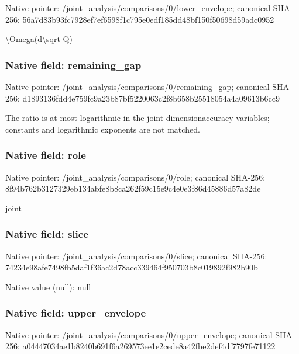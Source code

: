 \documentclass[10pt,a4paper]{article}
\begin{document}
Native pointer: /joint\_analysis/comparis\allowbreak{}ons/0/lower\_envelope; canonical SHA-256: 56a7d83b93fc7928ef7ef659\allowbreak{}8f1c795e0edf185dd48bf150\allowbreak{}f50698d59adc0952


\textbackslash{}Omega(d\textbackslash{}sqrt Q)


\subsubsection{Native field: remaining\_gap}


Native pointer: /joint\_analysis/comparis\allowbreak{}ons/0/remaining\_gap; canonical SHA-256: d1893136fdd4e759fc9a23b8\allowbreak{}7bf5220063c2f8b658b25518\allowbreak{}054a4a09613b6cc9


The ratio is at most logarithmic in the joint dimensionaccuracy variables; constants and logarithmic exponents are not matched.


\subsubsection{Native field: role}


Native pointer: /joint\_analysis/comparisons/0/role; canonical SHA-256: 8f94b762b3127329eb134abf\allowbreak{}e8b8ca262f59c15e9c4e0e3f\allowbreak{}86d45886d57a82de


joint


\subsubsection{Native field: slice}


Native pointer: /joint\_analysis/comparisons/0/slice; canonical SHA-256: 74234e98afe7498fb5daf1f3\allowbreak{}6ac2d78acc339464f950703b\allowbreak{}8c019892f982b90b



Native value (null): null



\subsubsection{Native field: upper\_envelope}


Native pointer: /joint\_analysis/comparis\allowbreak{}ons/0/upper\_envelope; canonical SHA-256: a04447034ae1b8240b691f6a\allowbreak{}269573ee1e2cede8a42fbe2d\allowbreak{}ef4df7797fe71122
\end{document}
